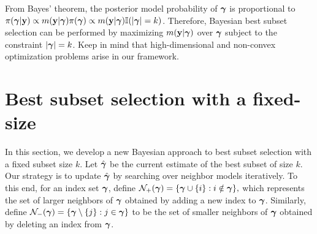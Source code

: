 From Bayes' theorem, the posterior model probability of ${\boldsymbol \gamma}$ is proportional to $\pi({\boldsymbol \gamma}|{\bf y})\propto m({\bf y}|{\boldsymbol \gamma}) \pi({\boldsymbol \gamma})\propto m({\bf y}|{\boldsymbol \gamma}) \mathbb{I}(|{\boldsymbol \gamma}|=k )$. Therefore, Bayesian best subset selection can be performed by maximizing $m({\bf y}|{\boldsymbol \gamma})$ over ${\boldsymbol \gamma}$ subject to the constraint $|{\boldsymbol \gamma}|=k$. Keep in mind that high-dimensional and non-convex optimization problems arise in our framework.


\section{Best subset selection with a fixed-size}\label{sec:3}
In this section, we develop a new Bayesian approach to best subset selection with a fixed subset size $k$. Let $\hat{{\boldsymbol \gamma}}$ be the current estimate of the best subset of size $k$. Our strategy is to update $\hat{{\boldsymbol \gamma}}$ by searching over neighbor models iteratively. To this end, for an index set ${\boldsymbol \gamma}$, define $\mathcal{N}_+({\boldsymbol \gamma})= \{{\boldsymbol \gamma} \cup \{i\}:i\notin {\boldsymbol \gamma}\},$ which represents the set of larger neighbors of ${\boldsymbol \gamma}$ obtained by adding a new index to ${\boldsymbol \gamma}$. Similarly, define $\mathcal{N}_-({\boldsymbol \gamma})= \{{\boldsymbol \gamma} \setminus \{j\}:j \in {\boldsymbol \gamma}\}$ to be the set of smaller neighbors of ${\boldsymbol \gamma}$ obtained by deleting an index from ${\boldsymbol \gamma}$. 

